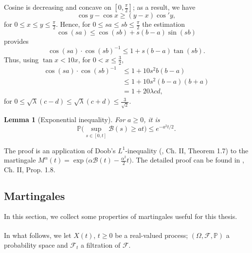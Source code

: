 \documentclass[11pt]{article}
\makeatletter
\renewenvironment{proof}[1][\proofname]{
   \par\pushQED{\qed}\normalfont
   \topsep6\p@\@plus6\p@\relax
   \trivlist\item[\hskip\labelsep\bfseries#1\@addpunct{.}]
   \ignorespaces
}{
   \popQED\endtrivlist\@endpefalse
}
\numberwithin{equation}{section}
\newtheorem{lemma}[theorem]{Lemma}
\makeatother
\begin{document}
\begin{proof}
  Cosine is decreasing and concave on $[0,\frac{\pi}{2}]$; as a result, we have
  $$
  \cos y - \cos x \geq (y-x) \cos 'y,
  $$
  for $0 \leq x \leq y \leq \frac{\pi}{2}$.
  Hence, for $0 \leq s a \leq s b \leq \frac{\pi}{2}$ the estimation
  $$
  \cos(s a) \leq
    \cos(s b) + s(b-a) 
      \sin(s b)
  $$ 
  provides 
  $$
  \cos(s a) 
        \cdot \cos (s b)^{-1}
  \leq 1 + s(b-a) \tan (s b).
  $$
  Thus, using $\tan x < 10x$, for $0 < x \leq \frac{3}{2}$, 
  \begin{equation}
    \begin{split}
      \cos(s a) 
            \cdot \cos (s b)^{-1}
      & \leq 1 + 10 s^2 b(b-a) \\
      & \leq 1 + 10 s^2 (b-a)(b+a)\\
      & = 1 + 20 \lambda c d, \nonumber
    \end{split}
  \end{equation}
  for $0 \leq \sqrt{\lambda} (c-d) 
  \leq \sqrt{\lambda}(c+d) 
  \leq \frac{3}{\sqrt{2}}$. 
\end{proof} 

\begin{lemma}[Exponential inequality]
  \label{Exponential Inequality}
  For $a \geq 0$, it is
  $$
  \mathbb{P} \bigg( \sup_{s \in [0,t]} 
      \mathcal{B}(s) \geq at \bigg)
        \leq e^{-a^2 t / 2}.
  $$
\end{lemma}

The proof is an application of Doob's $L^1$-inequality 
(\cite{revuz}, Ch. II, Theorem 1.7)
to the martingale $M^{\alpha}(t) = 
\exp \big(\alpha \mathcal{B}(t) - \frac{\alpha^2}{2}t \big)$. 
The detailed proof can be found in \cite{revuz}, Ch. II, Prop. 1.8.


\subsection{Martingales} 
\label{sec: Martingales}
In this section, we collect some properties of martingales 
useful for this thesis.\\~\\
In what follows, we let $X(t)$, $t\geq 0$ be a real-valued process;
$(\Omega, \mathcal{F}, \mathbb{P})$ a probability space 
and $\mathcal{F}_t$ a filtration of $\mathcal{F}$. 
\end{document}
